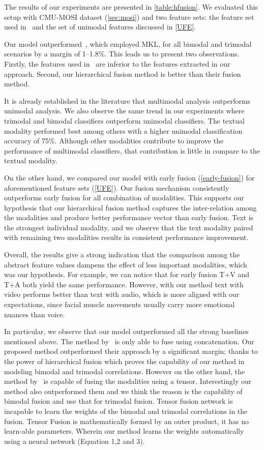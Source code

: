 \documentclass[review]{elsarticle}
\newcommand\?[1]{\hl{#1}}
\begin{document}
The results of our experiments are presented in \cref{table:hfusion}. We
evaluated this setup with CMU-MOSI dataset (\cref{sec:mosi}) and two
feature sets: the feature set used in~\citep{pordee}
and the set of unimodal features discussed in \cref{UFE}.

Our model outperformed~\citep{pordee}, which employed MKL, for all bimodal
and trimodal scenarios by a margin of 1--1.8\%. This leads us to present two
observations. Firstly, the features used in~\citep{pordee} are inferior to
the features extracted in our approach. Second, our hierarchical
fusion method is better than their fusion method.

It is already established in the literature
\citep{pordee,perez2013utterance} that multimodal analysis outperforms
unimodal analysis. We also observe the same trend in our experiments where
trimodal and bimodal classifiers outperform unimodal classifiers. The textual
modality performed best among others with a higher unimodal classification
accuracy of 75\%. Although other modalities contribute to improve the
performance of multimodal classifiers, that contribution is little in compare to
the textual modality.

On the other hand, we compared our model with early fusion
(\cref{early-fusion}) for aforementioned feature sets
(\cref{UFE}). Our fusion mechanism consistently outperforms early fusion for
all combination of modalities. This supports our
hypothesis that our hierarchical fusion method captures the
inter-relation among the modalities and produce better performance vector than
early fusion. Text is the strongest individual modality, and we observe that
the text modality paired with remaining two modalities results in consistent
performance improvement.

Overall, the results give a strong indication that the comparison among the
abstract feature values dampens the effect of less important modalities, which
was our hypothesis. For example, we can notice that for early fusion T+V and T+A
both yield the same performance. However, with our method text with video
performs better than text with audio, which is more aligned with our
expectations, since facial muscle movements usually carry more emotional nuances
than voice.

In particular, we observe that our model outperformed all the strong baselines mentioned above. The method by~\citep{pordee} is only able to fuse using concatenation. Our proposed method outperformed their approach by a significant margin; thanks to the power of hierarchical fusion which proves the capability of our method in modeling bimodal and trimodal correlations. However on the other hand, the method by~\citep{zadten} is capable of fusing the modalities using a tensor. Interestingly our method also outperformed them and we think the reason is the capability of bimodal fusion and use that for trimodal fusion. Tensor fusion network is incapable to learn the weights of the bimodal and trimodal correlations in the fusion. Tensor Fusion is mathematically formed by an outer product, it
has no learn-able parameters. Wherein our method learns the weights automatically using a neural network (Equation 1,2 and 3).
\end{document}
